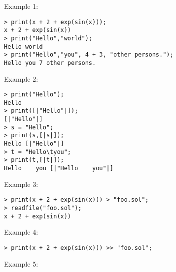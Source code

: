 \noindent Example 1: 
\begin{center}\begin{minipage}{15cm}\begin{Verbatim}[frame=single]
> print(x + 2 + exp(sin(x))); 
x + 2 + exp(sin(x))
> print("Hello","world");
Hello world
> print("Hello","you", 4 + 3, "other persons.");
Hello you 7 other persons.
\end{Verbatim}
\end{minipage}\end{center}
\noindent Example 2: 
\begin{center}\begin{minipage}{15cm}\begin{Verbatim}[frame=single]
> print("Hello");
Hello
> print([|"Hello"|]);
[|"Hello"|]
> s = "Hello";
> print(s,[|s|]);
Hello [|"Hello"|]
> t = "Hello\tyou";
> print(t,[|t|]);
Hello    you [|"Hello    you"|]
\end{Verbatim}
\end{minipage}\end{center}
\noindent Example 3: 
\begin{center}\begin{minipage}{15cm}\begin{Verbatim}[frame=single]
> print(x + 2 + exp(sin(x))) > "foo.sol";
> readfile("foo.sol");
x + 2 + exp(sin(x))

\end{Verbatim}
\end{minipage}\end{center}
\noindent Example 4: 
\begin{center}\begin{minipage}{15cm}\begin{Verbatim}[frame=single]
> print(x + 2 + exp(sin(x))) >> "foo.sol";
\end{Verbatim}
\end{minipage}\end{center}
\noindent Example 5: 
